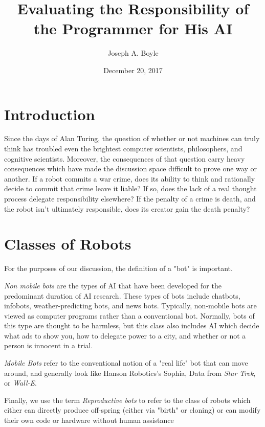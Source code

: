 \documentclass[12]{article}
\title{Evaluating the Responsibility of the Programmer for His AI}
\author{Joseph A. Boyle}
\date{December 20, 2017}
\begin{document}
\maketitle

\section{Introduction}
Since the days of Alan Turing\cite{turing_test}, the question of whether or not machines can truly think has troubled even the brightest computer scientists, philosophers, and cognitive scientists. Moreover, the consequences of that question carry heavy consequences which have made the discussion space difficult to prove one way or another. If a robot commits a war crime, does its ability to think and rationally decide to commit that crime leave it liable? If so, does the lack of a real thought process delegate responsibility elsewhere? If the penalty of a crime is death, and the robot isn't ultimately responsible, does its creator gain the death penalty?

\section{Classes of Robots}
	For the purposes of our discussion, the definition of a "bot" is important. 

	\textit{Non mobile bots} are the types of AI that have been developed for the predominant duration of AI research. These types of bots include chatbots, infobots, weather-predicting bots, and news bots. Typically, non-mobile bots are viewed as computer programs rather than a conventional bot. Normally, bots of this type are thought to be harmless, but this class also includes AI which decide what ads to show you, how to delegate power to a city, and whether or not a person is innocent in a trial. 
	
	\textit{Mobile Bots} refer to the conventional notion of a "real life" bot that can move around, and generally look like Hanson Robotics's Sophia, Data from \textit{Star Trek}, or \textit{Wall-E}. 
	
	Finally, we use the term \textit{Reproductive bots} to refer to the class of robots which either can directly produce off-spring (either via "birth" or cloning) or can modify their own code or hardware without human assistance
\end{document}
